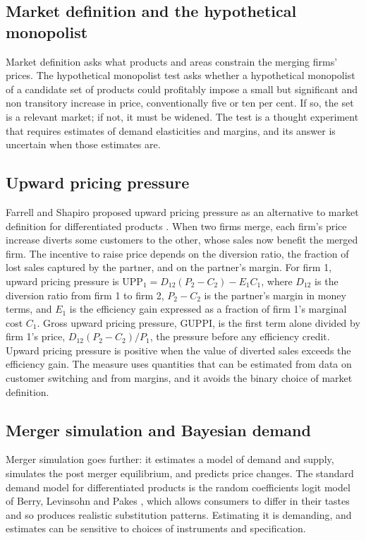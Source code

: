\subsection{Market definition and the hypothetical monopolist}

Market definition asks what products and areas constrain the merging firms' prices. The hypothetical monopolist test asks whether a hypothetical monopolist of a candidate set of products could profitably impose a small but significant and non transitory increase in price, conventionally five or ten per cent. If so, the set is a relevant market; if not, it must be widened. The test is a thought experiment that requires estimates of demand elasticities and margins, and its answer is uncertain when those estimates are.

\subsection{Upward pricing pressure}

Farrell and Shapiro proposed upward pricing pressure as an alternative to market definition for differentiated products \citep{farrell2010}. When two firms merge, each firm's price increase diverts some customers to the other, whose sales now benefit the merged firm. The incentive to raise price depends on the diversion ratio, the fraction of lost sales captured by the partner, and on the partner's margin. For firm 1, upward pricing pressure is $\mathrm{UPP}_1 = D_{12}(P_2 - C_2) - E_1 C_1$, where $D_{12}$ is the diversion ratio from firm 1 to firm 2, $P_2 - C_2$ is the partner's margin in money terms, and $E_1$ is the efficiency gain expressed as a fraction of firm 1's marginal cost $C_1$. Gross upward pricing pressure, GUPPI, is the first term alone divided by firm 1's price, $D_{12}(P_2 - C_2)/P_1$, the pressure before any efficiency credit. Upward pricing pressure is positive when the value of diverted sales exceeds the efficiency gain. The measure uses quantities that can be estimated from data on customer switching and from margins, and it avoids the binary choice of market definition.

\subsection{Merger simulation and Bayesian demand}

Merger simulation goes further: it estimates a model of demand and supply, simulates the post merger equilibrium, and predicts price changes. The standard demand model for differentiated products is the random coefficients logit model of Berry, Levinsohn and Pakes \citep{blp1995}, which allows consumers to differ in their tastes and so produces realistic substitution patterns. Estimating it is demanding, and estimates can be sensitive to choices of instruments and specification.

